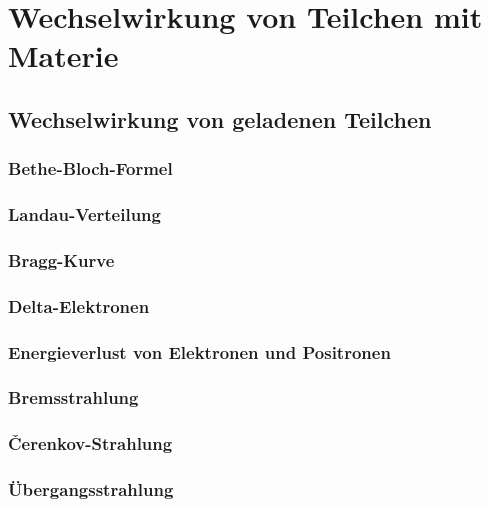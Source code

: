 \documentclass{article}
\begin{document}


\section{Wechselwirkung von Teilchen mit Materie}
\graphicspath{{bilder/1-1/}}
	\subsection{Wechselwirkung von geladenen Teilchen}
		
			\subsubsection{Bethe-Bloch-Formel}
				
			\subsubsection{Landau-Verteilung}
				
			\subsubsection{Bragg-Kurve}
				
			\subsubsection{Delta-Elektronen}
				
			\subsubsection{Energieverlust von Elektronen und Positronen}
				
			\subsubsection{Bremsstrahlung}
				
			\subsubsection{\v{C}erenkov-Strahlung}
				
			\subsubsection{Übergangsstrahlung}
				
\end{document}
